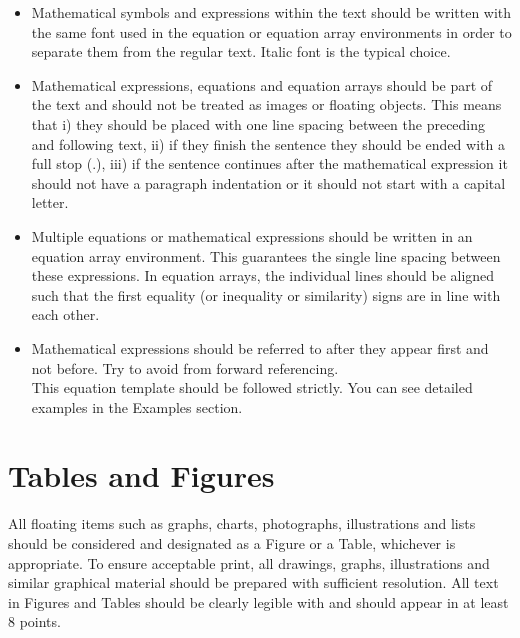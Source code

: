\documentclass[a4paper,oneside,12pt]{report}
\numberwithin{equation}{chapter}
\begin{document}
\begin{itemize}
\item Mathematical symbols and expressions within the text should be written with the same font used in the equation or equation array environments in order to separate them from the regular text. Italic font is the typical choice. \\

\item  Mathematical expressions, equations and equation arrays should be part of the text and should not be treated as images or floating objects. This means that i) they should be placed with one line spacing between the preceding and following text, ii) if they finish the sentence they should be ended with a full stop (.), iii) if the sentence continues after the mathematical expression it should not have a paragraph indentation or it should not start with a capital letter. \\

\item Multiple equations or mathematical expressions should be written in an equation array environment. This guarantees the single line spacing between these expressions. In equation arrays, the individual lines should be aligned such that the first equality (or inequality or similarity) signs are in line with each other.\\

\item Mathematical expressions should be referred to after they appear first and not before. Try to avoid from forward referencing. \\

This equation template should be followed strictly. You can see detailed examples in the Examples section.

\end{itemize}

\section{Tables and Figures}

All floating items such as graphs,
charts, photographs, illustrations and lists should be considered and
designated as a Figure or a Table, whichever is appropriate. To ensure acceptable print, all drawings, graphs, illustrations and similar graphical material should be prepared with sufficient resolution. All text in Figures and Tables should be clearly legible with and should appear in at least 8 points.
\end{document}
